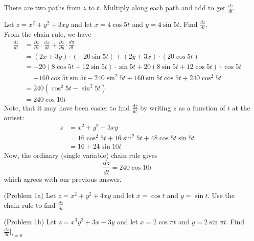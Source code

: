 \documentclass[handout]{ximera}
\begin{document}
There are two paths from $z$ to $t$. Multiply along each path and 
add to get $\frac{dz}{dt}$.
\begin{example}[Example 1]
Let $z = x^2 + y^2 + 3xy$ and let $x = 4\cos 5t$ and $y = 4\sin 5t$. 
Find $\frac{dz}{dt}$.\\
From the chain rule, we have
\begin{align*}
\frac{dz}{dt} &= \frac{\partial z}{\partial x} \cdot \frac{dx}{dt} + \frac{\partial z}{\partial y} \cdot \frac{dy}{dt}\\
              &= \left(2x + 3y\right) \cdot \left(-20 \sin 5t\right) + \left(2y + 3x\right) \cdot \left(20 \cos 5t\right)\\
              &= -20(8 \cos 5t + 12 \sin 5t) \cdot \sin 5t  + 20 (8 \sin 5t + 12 \cos 5t) \cdot \cos 5t \\
              &= -160 \cos 5t \sin 5t -240 \sin^2 5t + 160 \sin 5t \cos 5t + 240 \cos^2 5t\\
              &= 240 (\cos^2 5t - \sin^2 5t)\\
              &= 240 \cos 10t
\end{align*}
Note, that it may have been easier to find $\frac{dz}{dt}$ by writing $z$ as a 
function of $t$ at the outset:
\begin{align*}
z &= x^2 + y^2 + 3xy \\
   &= 16 \cos^2 5t + 16 \sin^2 5t + 48 \cos 5t \sin 5t\\
   & = 16 + 24 \sin 10t
\end{align*}
Now, the ordinary (single variable) chain rule gives
\[
\frac{dz}{dt} = 240 \cos 10t
\]
which agrees with our previous answer.
\end{example}








\begin{problem}(Problem 1a)
Let $z = x^2 + y^2 + 4xy$ and let $x = \cos t$ and $y = \sin t$. Use the chain 
rule to find $\frac{dz}{dt}$
\end{problem}


\begin{problem}(Problem 1b)
Let $z = x^3 y^3 + 3x - 3y$ and let $x = 2\cos \pi t$ and $y = 2\sin \pi t$. 
Find $\frac{dz}{dt}\bigg|_{t = 0}$
\end{problem}
\end{document}
